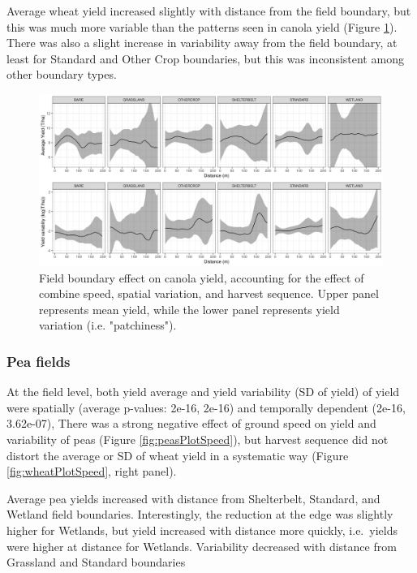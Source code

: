 \documentclass[]{elsarticle} %
\begin{document}
Average wheat yield increased slightly with distance from the field boundary, but this was much more variable than the patterns seen in canola yield (Figure \ref{fig:wheatPlot}).
There was also a slight increase in variability away from the field boundary, at least for Standard and Other Crop boundaries, but this was inconsistent among other boundary types.

\begin{figure}
\includegraphics[width=1\linewidth]{../Figures/ModelSummary3a_wheat} \caption{Field boundary effect on canola yield, accounting for the effect of combine speed, spatial variation, and harvest sequence. Upper panel represents mean yield, while the lower panel represents yield variation (i.e. "patchiness").}\label{fig:wheatPlot}
\end{figure}

\hypertarget{pea-fields}{%
\subsubsection{Pea fields}\label{pea-fields}}

At the field level, both yield average and yield variability (SD of yield) of yield were spatially (average p-values: 2e-16, 2e-16) and temporally dependent (2e-16, 3.62e-07),
There was a strong negative effect of ground speed on yield and variability of peas (Figure \ref{fig:peasPlotSpeed}), but harvest sequence did not distort the average or SD of wheat yield in a systematic way (Figure \ref{fig:wheatPlotSpeed}, right panel).

Average pea yields increased with distance from Shelterbelt, Standard, and Wetland field boundaries.
Interestingly, the reduction at the edge was slightly higher for Wetlands, but yield increased with distance more quickly, i.e.~yields were higher at distance for Wetlands.
Variability decreased with distance from Grassland and Standard boundaries
\end{document}
